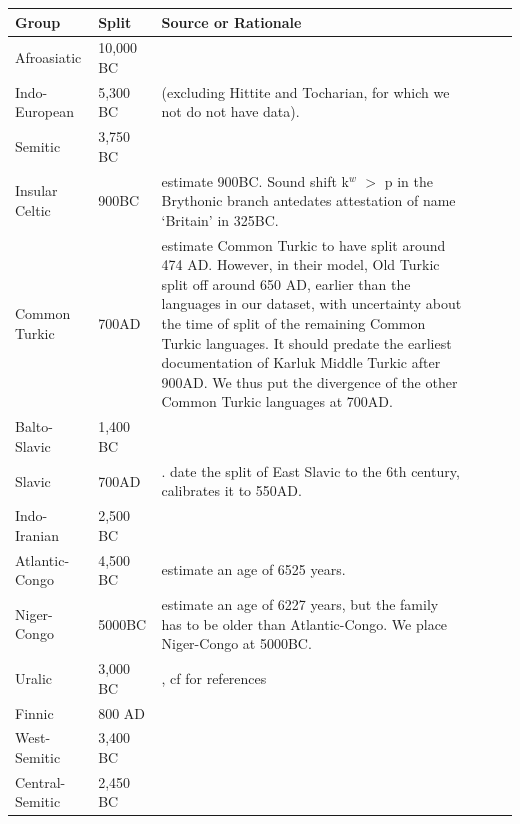 \documentclass[11pt,a4paper]{article}
\begin{document}
\begin{longtable}{llp{10cm}lll}
Group & Split & Source or Rationale \\ \hline
Afroasiatic & 10,000 BC & \cite{diakonoff1998the} \\
Indo-European & 5,300 BC & \citep{gray2003language} (excluding Hittite and Tocharian, for which we not do not have data). \\
Semitic & 3,750 BC & \citep{kitchen2009bayesian} \\
Insular Celtic & 900BC & \citep{gray2003language} estimate 900BC. Sound shift k$^w$ $>$ p in the Brythonic branch antedates attestation of name `Britain' in 325BC. \\ %
Common Turkic & 700AD & \cite[p. 49]{savelyev2020bayesian} estimate Common Turkic to have split around 474 AD. However, in their model, Old Turkic split off around 650 AD, earlier than the languages in our dataset, with uncertainty about the time of split of the remaining Common Turkic languages. It should predate the earliest documentation of Karluk Middle Turkic after 900AD. We thus put the divergence of the other Common Turkic languages at 700AD. \\
Balto-Slavic & 1,400 BC & \citep{gray2003language} \\
Slavic       & 700AD & \citep{gray2003language}. \citet[p. 209]{novotna2011glottochronology} date the split of East Slavic to the 6th century, \citep{holman2011automated} calibrates it to 550AD. \\
Indo-Iranian & 2,500 BC & \citep[p. 138]{parpola2013formation} \\ %
	Atlantic-Congo & 4,500 BC & \citet{holman2011automated} estimate an age of 6525 years.\\
	Niger-Congo & 5000BC & \citet{holman2011automated} estimate an age of 6227 years, but the family has to be older than Atlantic-Congo. We place Niger-Congo at 5000BC.\\
Uralic & 3,000 BC & \citep[Section 4.7]{maurits2020best}, cf \citep[p. 144]{parpola2013formation} for references \\
Finnic & 800 AD & \cite[Section 4.1]{maurits2020best} \\
West-Semitic & 3,400 BC & \citep{kitchen2009bayesian}  \\
Central-Semitic & 2,450 BC & \citep{kitchen2009bayesian}   \\

\end{longtable}
\end{document}
